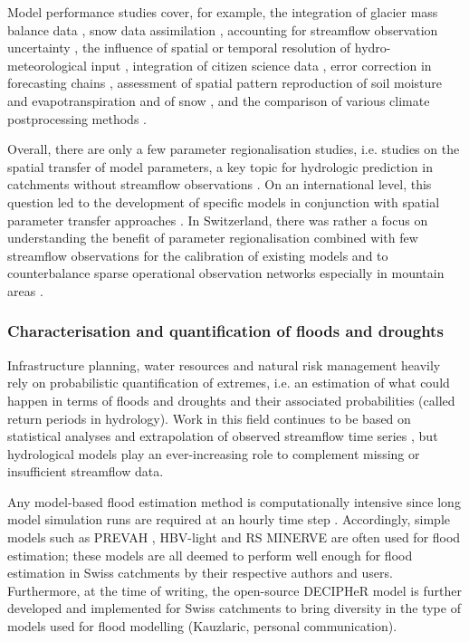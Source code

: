 \documentclass[10pt,a4paper]{article}
\begin{document}
Model performance studies cover, for example, the integration of glacier mass balance data \citep{Finger2015, Schaefli2011}, snow data assimilation \citep{Griessinger2016}, accounting for streamflow observation uncertainty \citep{Westerberg2020}, the influence of spatial or temporal resolution of hydro-meteorological input \citep{GironsLopez2016, Felder2017, Sikorska2018}, integration of citizen science data \citep{Etter2020}, error correction in forecasting chains \citep{Bogner2018}, assessment of spatial pattern reproduction of soil moisture and evapotranspiration \citep{Rossler2010, Zappa2003} and of snow \citep{Zappa2008a}, and the comparison of various climate postprocessing methods \citep{Rossler2019}.

Overall, there are only a few parameter regionalisation studies, i.e. studies on the spatial transfer of model parameters, a key topic for hydrologic prediction in catchments without streamflow observations \citep{Guo2021}. On an international level, this question led to the development of specific models in conjunction with spatial parameter transfer approaches \citep[e.g., mHM;][]{Samaniego2010a}. In Switzerland, there was rather a focus on understanding the benefit of parameter regionalisation combined with few streamflow observations for the calibration of existing models and to counterbalance sparse operational observation networks especially in mountain areas \citep{Viviroli2015}.


\subsubsection{Characterisation and quantification of floods and droughts}
\label{sec:context:floodsdroughts}

Infrastructure planning, water resources and natural risk management heavily rely on probabilistic quantification of extremes, i.e. an estimation of what could happen in terms of floods and droughts and their associated probabilities (called return periods in hydrology). Work in this field continues to be based on statistical analyses and extrapolation of observed streamflow time series \citep{Brunner2018, Asadi20108}, but hydrological models play an ever-increasing role to complement missing or insufficient streamflow data.

Any model-based flood estimation method is computationally intensive since long model simulation runs are required at an hourly time step \citep[see][about reducing computational requirements for extreme flood estimation by hydrological modelling]{SikorskaSenoner2020}. Accordingly, simple models such as PREVAH \citep{Viviroli2009, Viviroli2009c, Felder2017}, HBV-light \citep{Sikorska2017, Brunner2019a, SikorskaSenoner2020} and  RS MINERVE \citep{Bieri2013, Zeimetz2017, Zeimetz2018} are often used for flood estimation; these models are all deemed to perform well enough for flood estimation in Swiss catchments by their respective authors and users. Furthermore, at the time of writing, the open-source DECIPHeR model is further developed and implemented for Swiss catchments to bring diversity in the type of models used for flood modelling (Kauzlaric, personal communication).
\end{document}
